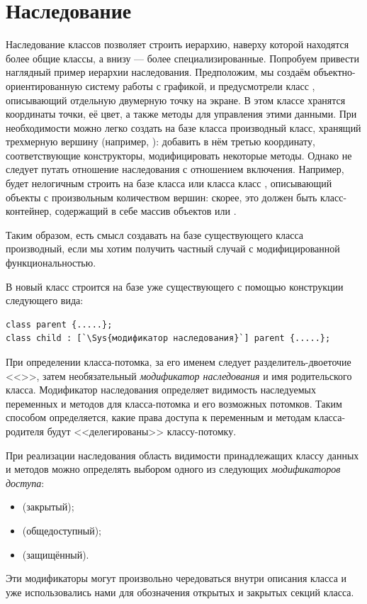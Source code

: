 \section[Наследование]{Наследование}
Наследование классов позволяет строить иерархию, наверху которой находятся более общие классы,
а внизу --- более специализированные. Попробуем привести наглядный пример иерархии наследования. Предположим, мы создаём
объектно-ориентированную систему работы с графикой, и предусмотрели класс , описывающий
отдельную двумерную точку на экране. В этом классе хранятся координаты точки, её цвет, а также методы для управления
этими данными. При необходимости можно легко создать на базе класса  производный класс,
хранящий трехмерную вершину (например, ): добавить в нём третью координату, соответствующие
конструкторы, модифицировать некоторые методы. Однако не следует путать отношение наследования с отношением включения.
Например, будет нелогичным строить на базе класса  или класса 
класс , описывающий объекты с произвольным количеством вершин: скорее, это должен быть
класс-контейнер, содержащий в себе массив объектов  или .

Таким образом, есть смысл создавать на базе существующего класса производный, если мы хотим получить частный случай с
модифицированной функциональностью. 

В  новый класс строится на базе уже существующего с помощью конструкции следующего вида:
\begin{lstlisting}
class parent {.....};
class child : [`\Sys{модификатор наследования}`] parent {.....};
\end{lstlisting}

При определении класса-потомка, за его именем следует разделитель-двоеточие <<\Sys{:}>>,  затем
необязательный \emph{модификатор наследования} и имя родительского класса. Модификатор
наследования определяет видимость наследуемых переменных и методов для класса-потомка и его возможных потомков. Таким
способом определяется, какие права доступа к переменным и методам класса-родителя будут <<делегированы>> классу-потомку. 

При реализации наследования область видимости принадлежащих классу данных и методов можно определять выбором одного из
следующих \emph{модификаторов доступа}:

\begin{itemize}
\item {} (закрытый);
\item {} (общедоступный); 
\item {} (защищённый).
\end{itemize}
Эти модификаторы могут произвольно чередоваться внутри описания класса и уже использовались нами для обозначения
открытых и закрытых секций класса. 

